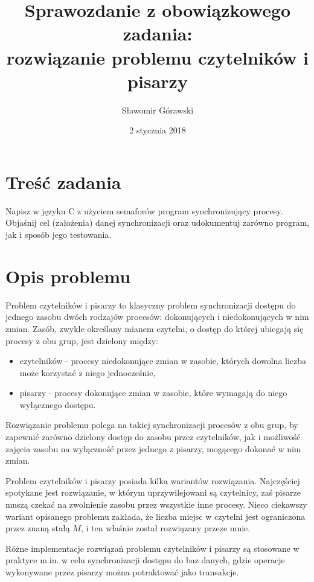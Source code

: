 \documentclass{article}
\title{Sprawozdanie z obowiązkowego zadania: \\ rozwiązanie problemu czytelników i pisarzy}
\author{Sławomir Górawski}
\date{2 stycznia 2018}
\begin{document}
\maketitle

\section{Treść zadania}

Napisz w języku C z użyciem semaforów program synchronizujący procesy.
Objaśnij cel (założenia) danej synchronizacji oraz udokumentuj zarówno
program, jak i sposób jego testowania.

\section{Opis problemu}

Problem czytelników i pisarzy to klasyczny problem synchronizacji
dostępu do jednego zasobu dwóch rodzajów procesów:
dokonujących i niedokonujących w nim zmian.
Zasób, zwykle określany mianem czytelni,
o dostęp do której ubiegają się procesy z obu grup,
jest dzielony między:

\begin{itemize}
    \item czytelników - procesy niedokonujące zmian w zasobie,
        których dowolna liczba może korzystać z niego jednocześnie,
    \item pisarzy - procesy dokonujące zmian w zasobie,
        które wymagają do niego wyłącznego dostępu.
\end{itemize}

Rozwiązanie problemu polega na takiej synchronizacji procesów z obu grup,
by zapewnić zarówno dzielony dostęp do zasobu przez czytelników,
jak i możliwość zajęcia zasobu na wyłączność przez jednego z pisarzy,
mogącego dokonać w nim zmian.

Problem czytelników i pisarzy posiada kilka wariantów rozwiązania.
Najczęściej spotykane jest rozwiązanie,
w którym uprzywilejowani są czytelnicy,
zaś pisarze muszą czekać na zwolnienie zasobu przez wszystkie inne procesy.
Nieco ciekawszy wariant opisanego problemu zakłada,
że liczba miejsc w czytelni jest ograniczona przez znaną stałą $M$,
i ten właśnie został rozwiązany przeze mnie.

Różne implementacje rozwiązań problemu czytelników i pisarzy są stosowane w praktyce m.in.
w celu synchronizacji dostępu do baz danych,
gdzie operacje wykonywane przez pisarzy można potraktować jako transakcje.
\end{document}
